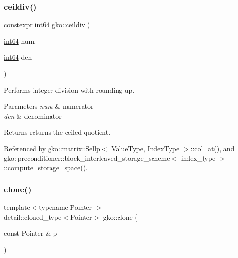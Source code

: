 \subsubsection{\texorpdfstring{ceildiv()}{ceildiv()}}
{\footnotesize\ttfamily constexpr \hyperlink{namespacegko_a6c57dbf3168b1ecad3ea133aaf2efbc1}{int64} gko\+::ceildiv (\begin{DoxyParamCaption}\item[{\hyperlink{namespacegko_a6c57dbf3168b1ecad3ea133aaf2efbc1}{int64}}]{num,  }\item[{\hyperlink{namespacegko_a6c57dbf3168b1ecad3ea133aaf2efbc1}{int64}}]{den }\end{DoxyParamCaption})\hspace{0.3cm}{\ttfamily [inline]}}



Performs integer division with rounding up. 


\begin{DoxyParams}{Parameters}
{\em num} & numerator \\
\hline
{\em den} & denominator\\
\hline
\end{DoxyParams}
\begin{DoxyReturn}{Returns}
returns the ceiled quotient. 
\end{DoxyReturn}


Referenced by gko\+::matrix\+::\+Sellp$<$ Value\+Type, Index\+Type $>$\+::col\+\_\+at(), and gko\+::preconditioner\+::block\+\_\+interleaved\+\_\+storage\+\_\+scheme$<$ index\+\_\+type $>$\+::compute\+\_\+storage\+\_\+space().

\mbox{\label{namespacegko_a1beb80750459e4201aa9d882d2d074c3}} 
\subsubsection{\texorpdfstring{clone()}{clone()}\hspace{0.1cm}{\footnotesize\ttfamily [1/2]}}
{\footnotesize\ttfamily template$<$typename Pointer $>$ \\
detail\+::cloned\+\_\+type$<$Pointer$>$ gko\+::clone (\begin{DoxyParamCaption}\item[{const Pointer \&}]{p }\end{DoxyParamCaption})\hspace{0.3cm}{\ttfamily [inline]}}



